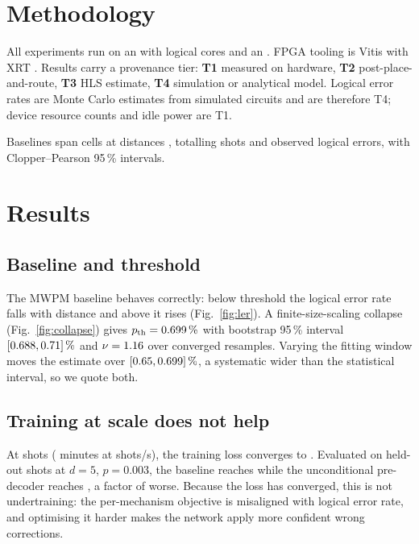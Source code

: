 \documentclass[pdflatex,sn-mathphys-num]{sn-jnl}
\begin{document}
\section{Methodology}\label{sec:method}

All experiments run on an \envCPU{} with \envCores{} logical cores and an
\envGPU. FPGA tooling is Vitis \envVitis{} with XRT \envXRT. Results carry a
provenance tier: \textbf{T1} measured on hardware, \textbf{T2}
post-place-and-route, \textbf{T3} HLS estimate, \textbf{T4} simulation or
analytical model. Logical error rates are Monte Carlo estimates from simulated
circuits and are therefore T4; device resource counts and idle power are T1.

Baselines span \baselineCells{} cells at distances \baselineDistances, totalling
\baselineShots{} shots and \baselineErrors{} observed logical errors, with
Clopper--Pearson 95\,\% intervals.

\section{Results}\label{sec:results}

\subsection{Baseline and threshold}

The MWPM baseline behaves correctly: below threshold the logical error rate falls
with distance and above it rises (Fig.~\ref{fig:ler}). A finite-size-scaling
collapse (Fig.~\ref{fig:collapse}) gives $p_{\mathrm{th}} = 0.699\,\%$ with
bootstrap 95\,\% interval
$[0.688, 0.71]\,\%$ and $\nu = 1.16$ over \pthBootstrap{} converged
resamples. Varying the fitting window moves the estimate over
$[0.65, 0.699]\,\%$, a systematic wider than the statistical
interval, so we quote both.

\subsection{Training at scale does not help}

At \trainShots{} shots (\trainMinutes{} minutes at \trainRate{} shots/s), the
training loss converges to \trainFinalLoss. Evaluated on \hierTestShots{} held-out
shots at $d=5$, $p=0.003$, the baseline reaches \hierBaselineLER{} while the
unconditional pre-decoder reaches \hierPreOnlyLER, a factor of
\hierPreOnlyRatio{} worse. Because the loss has converged, this is not
undertraining: the per-mechanism objective is misaligned with logical error rate,
and optimising it harder makes the network apply more confident wrong
corrections.
\end{document}
